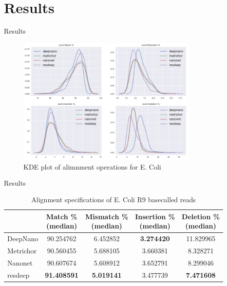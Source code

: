 \documentclass[10pt]{beamer}
\begin{document}
\section{Results}
\begin{frame}[fragile]{Results}	
	\begin{figure}[!htb]
		\begin{center}
			\includegraphics[width=0.8\textwidth]{imgs/results/kde_cigar.png}
			\caption{KDE plot of alimnment operations for E. Coli}
			\label{fg:consensus}
		\end{center}
	\end{figure}
\end{frame}


\begin{frame}[fragile]{Results}
	\begin{table}[htbp]
		\caption{Alignment specifications of E. Coli R9 basecalled reads}
		\label{tbl:ecoli_rates}
		\centering
		\begin{tabular}{lcccc}
			\toprule
			{} &  \thead{Match \% \\(median)} &  \thead{Mismatch \% \\(median)} &  \thead{Insertion \% \\(median)} &  \thead{Deletion \% \\(median)} \\
			\midrule
			DeepNano   &                  90.254762 &                      6.452852 &                       \textbf{3.274420} &                     11.829965 \\
			Metrichor  &                  90.560455 &                      5.688105 &                       3.660381 &                      8.328271 \\
			Nanonet    &                  90.607674 &                      5.608912 &                       3.652791 &                      8.299046 \\
			resdeep    &                  \textbf{91.408591} &                     \textbf{ 5.019141} &                       3.477739 &                      \textbf{7.471608 }\\
			\bottomrule
		\end{tabular}
	\end{table}
	
\end{frame}
\end{document}
